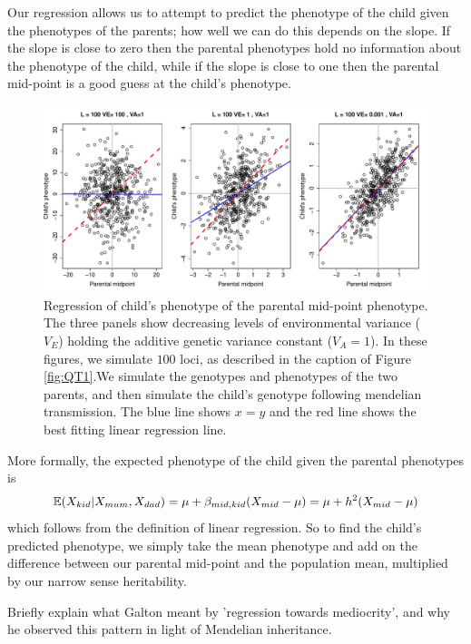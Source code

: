 Our regression allows us to attempt to predict the phenotype of the
child given the phenotypes of the parents; how well we can do this depends on the
slope. If the slope is close to zero then the parental phenotypes hold no
information about the phenotype of the child, while if the slope is
close to one then the parental mid-point is a good guess at the child's
phenotype.\\
\begin{figure}
\begin{center}
\includegraphics[width=\textwidth]{figures/QT2.pdf}
\end{center}
\caption{Regression of child's phenotype of the parental mid-point phenotype. The three panels show decreasing levels of environmental
  variance ($V_E$) holding the additive genetic variance constant ($V_A=1$). 
 In these figures, we simulate $100$ loci, as described in
 the caption of Figure \ref{fig:QT1}.We simulate the genotypes and
 phenotypes of the two parents, and then simulate the child's genotype
following mendelian transmission. The blue line shows $x=y$ and the red
line shows the best fitting linear regression line. }
\end{figure}

More formally, the expected phenotype of the child given the parental
phenotypes is
\begin{equation}
\mathbb{E}(X_{kid} | X_{mum},X_{dad}) = \mu +
\beta_{mid,kid}(X_{mid} - \mu) =\mu + h^2(X_{mid} - \mu)  \label{predict_kid}
\end{equation}
which follows from the definition of linear regression. So to find the
child's predicted phenotype, we simply take the mean phenotype and add on the difference between our parental mid-point and the population mean, multiplied by our
narrow sense heritability. \\


\begin{question}
Briefly explain what Galton meant by 'regression towards
mediocrity', and why he observed this pattern in light of Mendelian inheritance.
\end{question}

